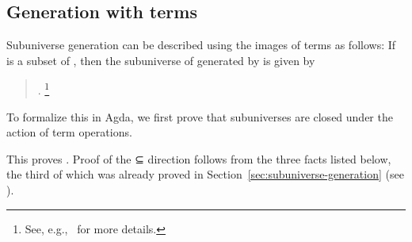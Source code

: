 \documentclass[a4paper,USenglish,cleveref,autoref,thm-restate]{lipics-v2019}
\begin{document}
\subsection{Generation with terms}\label{sec:generation-with-terms}
Subuniverse generation can be described using the images of terms as follows: If  is a subset of , then the subuniverse of  generated by  is given by
\begin{quote}
  \AgdaSpace{}\AgdaSpace{}\AgdaSymbol{=}\AgdaSpace{}\AgdaSymbol{\{(}\AgdaSpace{}\AgdaSpace{}\AgdaSymbol{)}\AgdaSpace{}\AgdaSpace{}\AgdaSymbol{|}\AgdaSpace{}\AgdaSpace{}\AgdaSymbol{:}\AgdaSpace{}\AgdaSymbol{(}\AgdaSymbol{)}\AgdaSymbol{,}\AgdaSpace{}\AgdaSpace{}\AgdaSymbol{:}\AgdaSpace{}\AgdaSpace{}\AgdaSymbol{\}}.%
\footnote{See, e.g.,~\cite{Bergman:2012} for more details.}
\end{quote}
To formalize this in Agda, we first prove that subuniverses are closed under the action of term operations.
\begin{code}\end{code}
This proves \AgdaSpace{}\AgdaSpace{}\AgdaSpace{}\AgdaSymbol{\{(}\AgdaSpace{}\AgdaSpace{}\AgdaSymbol{)}\AgdaSpace{}\AgdaSpace{}\AgdaSymbol{|}\AgdaSpace{}\AgdaSpace{}\AgdaSymbol{:}\AgdaSpace{}\AgdaSymbol{(}\AgdaSymbol{)}\AgdaSymbol{,}\AgdaSpace{}\AgdaSpace{}\AgdaSymbol{:}\AgdaSpace{}\AgdaSpace{}\AgdaSymbol{\}}. Proof of the ⊆  direction follows from the three facts listed below, the third of which was already proved in Section~\ref{sec:subuniverse-generation} (see ).
\end{document}
